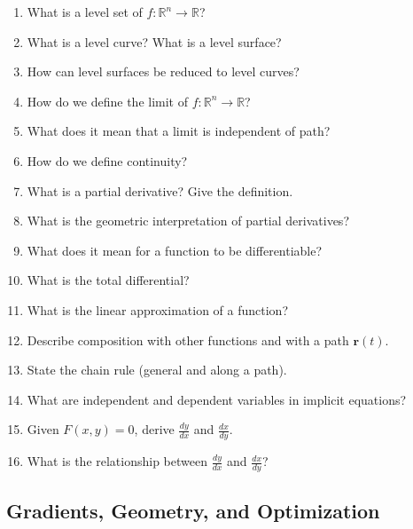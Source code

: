 \begin{enumerate}[resume]
  \item What is a level set of $f:\mathbb{R}^n \to \mathbb{R}$?
  \item What is a level curve? What is a level surface?
  \item How can level surfaces be reduced to level curves?
  \item How do we define the limit of $f:\mathbb{R}^n \to \mathbb{R}$?
  \item What does it mean that a limit is independent of path?
  \item How do we define continuity?
  \item What is a partial derivative? Give the definition.
  \item What is the geometric interpretation of partial derivatives?
  \item What does it mean for a function to be differentiable?
  \item What is the total differential?
  \item What is the linear approximation of a function?
  \item Describe composition with other functions and with a path $\mathbf{r}(t)$.
  \item State the chain rule (general and along a path).
  \item What are independent and dependent variables in implicit equations?
  \item Given $F(x,y)=0$, derive $\frac{dy}{dx}$ and $\frac{dx}{dy}$.
  \item What is the relationship between $\frac{dy}{dx}$ and $\frac{dx}{dy}$?
\end{enumerate}

\subsection{Gradients, Geometry, and Optimization}

